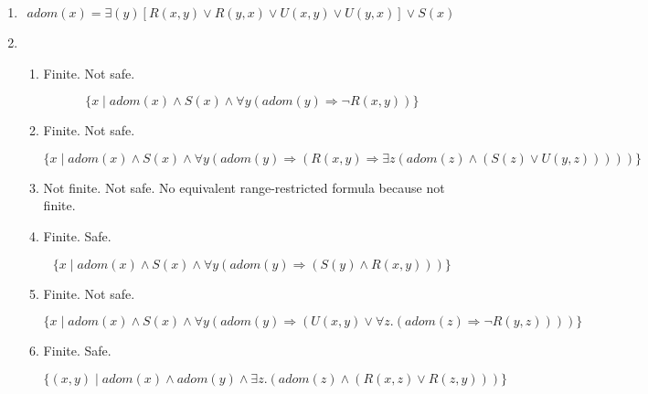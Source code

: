 \documentclass[12pt]{article}
\begin{document}
\begin{enumerate}
\item %
\begin{displaymath}
adom(x) = \exists(y) [R(x,y) \lor R(y,x) \lor U(x,y) \lor U(y,x)] \lor S(x)
\end{displaymath}
\item %
\begin{enumerate}
\item %
Finite. Not safe.

\begin{displaymath}
\{x \mid adom(x) \land S(x) \land \forall{y} (adom(y) \Rightarrow \lnot R(x,y))\}
\end{displaymath}

\item %
Finite. Not safe.

\begin{displaymath}
\{x \mid adom(x) \land S(x) \land \forall{y} (adom(y) \Rightarrow (R(x,y) \Rightarrow \exists{z}(adom(z) \land(S(z) \lor U(y,z)))))\}
\end{displaymath}

\item %
Not finite. Not safe. No equivalent range-restricted formula because not finite.

\item %
Finite. Safe.

\begin{displaymath}
\{x \mid adom(x) \land S(x) \land \forall{y} (adom(y) \Rightarrow (S(y) \land R(x,y)))\}
\end{displaymath}

\item %
Finite. Not safe.

\begin{displaymath}
\{x \mid adom(x) \land S(x) \land \forall{y}(adom(y) \Rightarrow (U(x,y) \lor \forall{z}.(adom(z) \Rightarrow \lnot R(y,z))))\}
\end{displaymath}

\item %
Finite. Safe.

\begin{displaymath}
\{(x,y) \mid adom(x) \land adom(y) \land \exists{z}.(adom(z) \land (R(x,z) \lor R(z,y)))\}
\end{displaymath}

\end{enumerate}
\end{enumerate}
\end{document}
